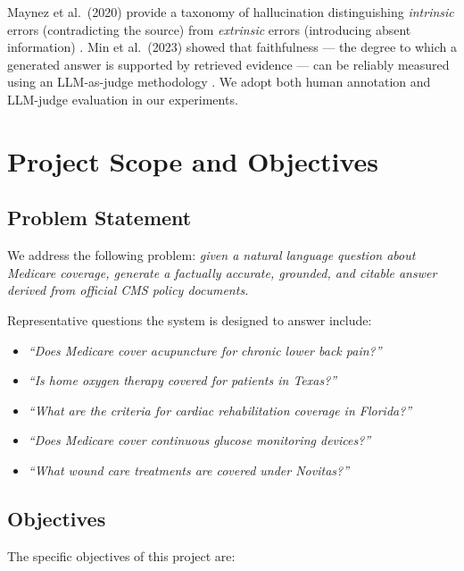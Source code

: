 \documentclass[10pt, letterpaper]{article}
\begin{document}
Maynez et al.\ (2020) provide a taxonomy of hallucination distinguishing \textit{intrinsic}
errors (contradicting the source) from \textit{extrinsic} errors (introducing absent
information) \cite{maynez2020hallucination}. Min et al.\ (2023) showed that faithfulness
--- the degree to which a generated answer is supported by retrieved evidence --- can be
reliably measured using an LLM-as-judge methodology \cite{min2023faitheval}. We adopt
both human annotation and LLM-judge evaluation in our experiments.
 
\section{Project Scope and Objectives}
 
\subsection{Problem Statement}
 
We address the following problem: \textit{given a natural language question about Medicare
coverage, generate a factually accurate, grounded, and citable answer derived from official
CMS policy documents.}
 
Representative questions the system is designed to answer include:
 
\begin{itemize}[noitemsep, topsep=4pt]
    \item \textit{``Does Medicare cover acupuncture for chronic lower back pain?''}
    \item \textit{``Is home oxygen therapy covered for patients in Texas?''}
    \item \textit{``What are the criteria for cardiac rehabilitation coverage in Florida?''}
    \item \textit{``Does Medicare cover continuous glucose monitoring devices?''}
    \item \textit{``What wound care treatments are covered under Novitas?''}
\end{itemize}
 
\subsection{Objectives}
 
The specific objectives of this project are:
 
\end{document}
